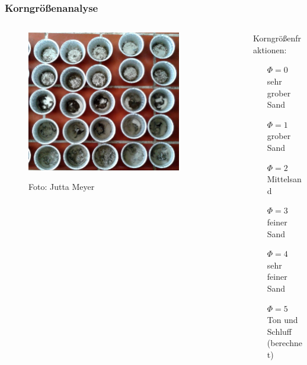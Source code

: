 \documentclass[xcolor=dvipsnames]{beamer}
\begin{document}
\begin{frame}[t]
\frametitle{Korngrößenanalyse}
\begin{columns}[t]
\begin{column}{6.4cm}
\begin{figure}
\includegraphics[width=0.8\textwidth]{images/Fotos/sediment.jpg} 

{\small Foto: Jutta Meyer}
\hspace*{-8mm}
\end{figure}
\end{column}

\begin{column}{4.4cm}
{\large Korngrößenfraktionen:}
\begin{itemize}
\item[]
\item[$\Phi = 0$]  sehr grober Sand
\item[$\Phi = 1$]  grober Sand
\item[$\Phi = 2$]  Mittelsand
\item[$\Phi = 3$]  feiner Sand
\item[$\Phi = 4$] sehr feiner Sand
\item[$\Phi = 5$] Ton und Schluff (berechnet)
\end{itemize}

\end{column}
\end{columns}
\end{frame}

\end{document}

